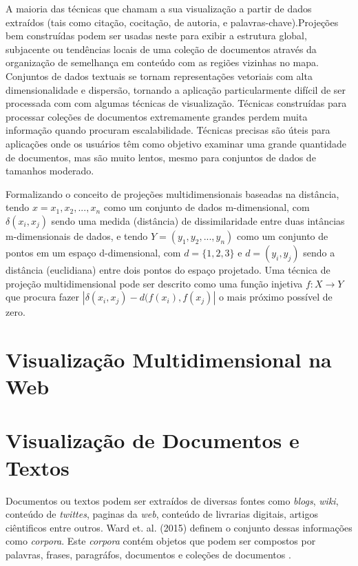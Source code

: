A maioria das técnicas  que chamam a sua visualização a partir de dados extraídos (tais como citação, cocitação, de autoria, e palavras-chave).Projeções bem construídas podem ser usadas neste para exibir a estrutura global, subjacente ou tendências locais de uma coleção de documentos através da organização de semelhança em conteúdo com as regiões vizinhas no mapa. Conjuntos de dados textuais se tornam representações vetoriais com alta dimensionalidade e dispersão, tornando a aplicação particularmente difícil de ser processada com com algumas técnicas de visualização. Técnicas construídas para processar coleções de documentos extremamente grandes perdem muita informação quando procuram escalabilidade. Técnicas precisas são úteis para aplicações onde os usuários têm como objetivo examinar uma grande quantidade de documentos, mas são muito lentos, mesmo para conjuntos de dados de tamanhos moderado.


Formalizando o conceito de projeções multidimensionais baseadas na distância, tendo  $x={x_{1}, x_{2},...,x_{n}}$ como um conjunto de dados m-dimensional, com $\delta (x_{i},x_{j})$ sendo uma medida (distância) de dissimilaridade entre duas intâncias m-dimensionais de dados, e tendo $Y=(y_{1},y_{2},...,y_{n})$ como um conjunto de pontos em um espaço d-dimensional, com $d=\{1,2,3\}$ e $d=(y_{i},y_{j})$ sendo a distância (euclidiana) entre dois pontos do espaço projetado. Uma técnica de projeção multidimensional pode ser descrito como uma função injetiva $f : X\rightarrow Y$ que procura fazer $|\delta (x_{i}, x_{j})-d(f(x_{i}),f(x_{j})|$ o mais próximo possível de zero.

\section{Visualização Multidimensional na Web}



\section{Visualização de Documentos e Textos}
\label{Visualizacao_texto}

Documentos ou textos podem ser extraídos de diversas fontes como \emph{blogs}, \emph{wiki}, conteúdo de \emph{twittes}, paginas da \emph{web}, conteúdo de livrarias digitais\cite{ward2015interactive}, artigos ciêntificos entre outros. Ward et. al. (2015)\cite{ward2015interactive} definem o conjunto dessas informações como \emph{corpora}.  Este \emph{corpora} contém objetos que podem ser compostos por palavras, frases, paragráfos, documentos e coleções de documentos \cite{ward2015interactive}.

